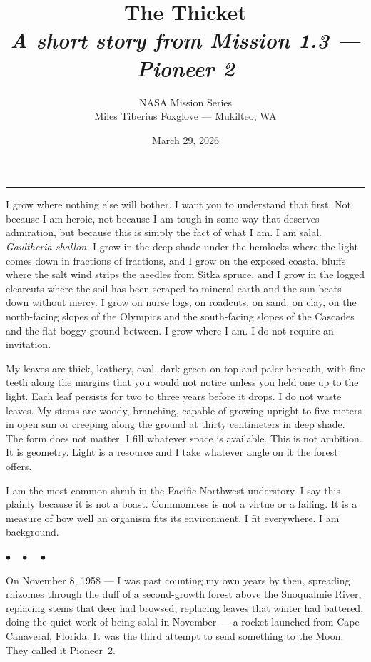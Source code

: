 \documentclass[12pt, letterpaper]{article}
\title{\Huge\textbf{The Thicket}\\[0.5em]\large\textit{A short story from Mission 1.3 --- Pioneer 2}}
\author{NASA Mission Series\\[0.3em]\small Miles Tiberius Foxglove --- Mukilteo, WA}
\date{March 29, 2026}
\begin{document}
\maketitle
\thispagestyle{empty}

\vspace{1em}
\noindent\rule{\textwidth}{0.4pt}
\vspace{1em}

\noindent I grow where nothing else will bother. I want you to understand that first. Not because I am heroic, not because I am tough in some way that deserves admiration, but because this is simply the fact of what I am. I am salal. \textit{Gaultheria shallon.} I grow in the deep shade under the hemlocks where the light comes down in fractions of fractions, and I grow on the exposed coastal bluffs where the salt wind strips the needles from Sitka spruce, and I grow in the logged clearcuts where the soil has been scraped to mineral earth and the sun beats down without mercy. I grow on nurse logs, on roadcuts, on sand, on clay, on the north-facing slopes of the Olympics and the south-facing slopes of the Cascades and the flat boggy ground between. I grow where I am. I do not require an invitation.

My leaves are thick, leathery, oval, dark green on top and paler beneath, with fine teeth along the margins that you would not notice unless you held one up to the light. Each leaf persists for two to three years before it drops. I do not waste leaves. My stems are woody, branching, capable of growing upright to five meters in open sun or creeping along the ground at thirty centimeters in deep shade. The form does not matter. I fill whatever space is available. This is not ambition. It is geometry. Light is a resource and I take whatever angle on it the forest offers.

I am the most common shrub in the Pacific Northwest understory. I say this plainly because it is not a boast. Commonness is not a virtue or a failing. It is a measure of how well an organism fits its environment. I fit everywhere. I am background.

\begin{center}
$\bullet\quad\bullet\quad\bullet$
\end{center}

On November 8, 1958 --- I was past counting my own years by then, spreading rhizomes through the duff of a second-growth forest above the Snoqualmie River, replacing stems that deer had browsed, replacing leaves that winter had battered, doing the quiet work of being salal in November --- a rocket launched from Cape Canaveral, Florida. It was the third attempt to send something to the Moon. They called it Pioneer~2.
\end{document}
